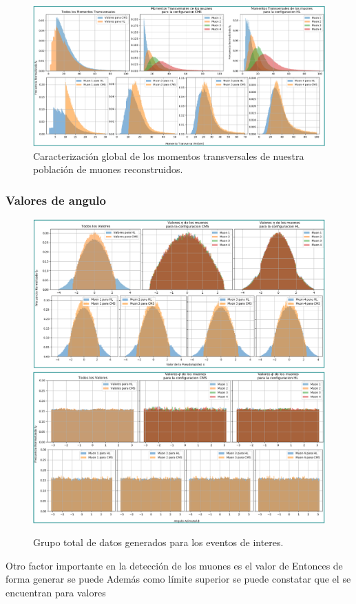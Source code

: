 \begin{figure}[h]
\centering
\includegraphics[width=.8\textwidth]{Simulacion/imagenes/Datos_PT_ALL.png}
\caption{Caracterización global de los momentos transversales de nuestra población de muones reconstruidos.}
\label{procesos_darksusy_PTyISO}
\end{figure}



\subsubsection{Valores de angulo}
\begin{figure}[h]
\centering
\includegraphics[width=.8\textwidth]{Simulacion/imagenes/Datos_Eta_ALL.png}
\includegraphics[width=.8\textwidth]{Simulacion/imagenes/Datos_Phi_ALL.png}
\caption{Grupo total de datos generados para los eventos de interes.}
\label{procesos_darksusy_ETAyPHI}
\end{figure}





Otro factor importante en la detección de los muones es el valor de Entonces de forma generar se puede Además como límite superior se puede constatar que el  se encuentran para valores 




















